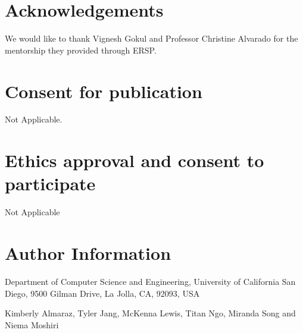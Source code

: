 \documentclass[twocolumn]{bmcart}%
\begin{document}
\begin{backmatter}
\section*{Acknowledgements}
We would like to thank Vignesh Gokul and Professor Christine Alvarado for the mentorship they provided through ERSP.

\section*{Consent for publication}
Not Applicable.
    
\section*{Ethics approval and consent to participate}
Not Applicable

\section*{Author Information}
    Department of Computer Science and Engineering, University of California San Diego, 9500 Gilman Drive, La Jolla, CA, 92093, USA
    
    Kimberly Almaraz, Tyler Jang, McKenna Lewis, Titan Ngo, Miranda Song and Niema Moshiri
    



\end{backmatter}
\end{document}
